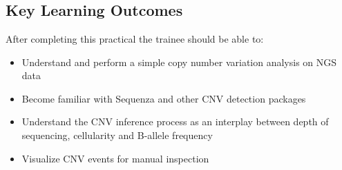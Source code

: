 



\chapter{\moduleTitle}


\newpage


\section{Key Learning Outcomes}

After completing this practical the trainee should be able to:

\begin{itemize}
  \item Understand and perform a simple copy number variation analysis on NGS data
  \item Become familiar with Sequenza and other CNV detection packages
  \item Understand the CNV inference process as an interplay between depth of sequencing, cellularity and B-allele frequency
  \item Visualize CNV events for manual inspection
\end{itemize}


